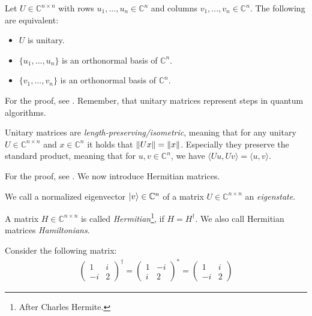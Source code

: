 \begin{theorem} \label{theorem_unitary_matrices_characterization}
    Let \(U \in \mathbb{C}^{n \times n}\) with rows \(u_1, ..., u_n \in \mathbb{C}^n\) and columns \(v_1, ..., v_n \in \mathbb{C}^n\). The following are equivalent:
    \begin{itemize}
        \item \(U\) is unitary.
        \item \(\{u_1, ..., u_n\}\) is an orthonormal basis of \(\mathbb{C}^n\).
        \item \(\{v_1, ..., v_n\}\) is an orthonormal basis of \(\mathbb{C}^n\).
    \end{itemize}
\end{theorem}

For the proof, see \cite[pp. 351-352]{Fischer2020}. Remember, that unitary matrices represent steps in quantum algorithms.

\begin{theorem} \label{theorem_unitary_isometry}
    Unitary matrices are \emph{length-preserving/isometric}, meaning that for any unitary \(U \in \mathbb{C}^{n \times n}\) and \(x \in \mathbb{C}^n\) it holds that \(\norm{Ux} = \norm{x}\). Especially they preserve the standard product, meaning that for \(u, v \in \mathbb{C}^n\), we have \(\langle Uu, Uv \rangle = \langle u, v \rangle\).
\end{theorem}

For the proof, see \cite[pp. 350-351]{Fischer2020}. We now introduce Hermitian matrices.

\begin{definition} \label{definition_eigenstates}
    We call a normalized eigenvector \(\ket{v} \in \mathbb{C}^n\) of a matrix \(U \in \mathbb{C}^{n \times n}\) an \emph{eigenstate}.
\end{definition}

\begin{definition} \label{definition_hermitian_matrix}
    A matrix \(H \in \mathbb{C}^{n \times n}\) is called \emph{Hermitian}\footnote{After Charles Hermite.}, if \(H = H^\dagger\). We also call Hermitian matrices \emph{Hamiltonians}.
\end{definition}

\begin{example} \label{example_hermitian_matrix}
    Consider the following matrix:
    \begin{align}
        \begin{pmatrix*}
            1 & i\\
            -i & 2
        \end{pmatrix*}^\dagger = \begin{pmatrix*}
            1 & -i\\
            i & 2
        \end{pmatrix*}^* = \begin{pmatrix*}
            1 & i\\
            -i & 2
        \end{pmatrix*}
    \end{align}
\end{example}

